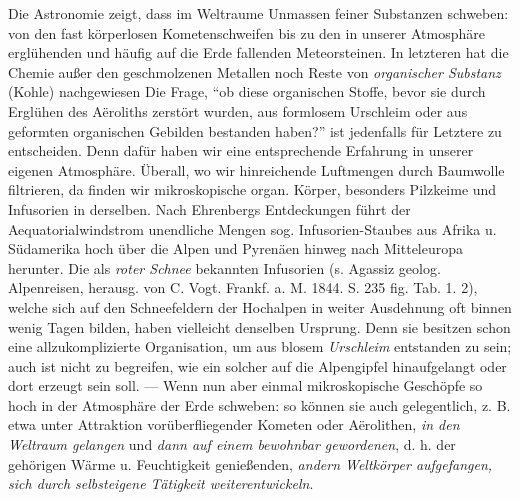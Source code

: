 \documentclass[a4paper, 11pt, oneside, english]{article}
\begin{document}
Die Astronomie zeigt, dass im Weltraume Unmassen feiner Substanzen schweben: von den fast körperlosen Kometenschweifen bis zu den in unserer Atmosphäre erglühenden und häufig auf die Erde fallenden Meteorsteinen. In letzteren hat die Chemie außer den geschmolzenen Metallen noch Reste von \emph{organischer Substanz} (Kohle) nachgewiesen Die Frage, "`ob diese organischen Stoffe, bevor sie durch Erglühen des Aëroliths zerstört wurden, aus formlosem Urschleim oder aus geformten organischen Gebilden bestanden haben?"' ist jedenfalls für Letztere zu entscheiden. Denn dafür haben wir eine entsprechende Erfahrung in unserer eigenen Atmosphäre. Überall, wo wir hinreichende Luftmengen durch Baumwolle filtrieren, da finden wir mikroskopische organ. Körper, besonders Pilzkeime und Infusorien in derselben. Nach Ehrenbergs Entdeckungen führt der Aequatorialwindstrom unendliche Mengen sog. Infusorien-Staubes aus Afrika u. Südamerika hoch über die Alpen und Pyrenäen hinweg nach Mitteleuropa herunter. Die als \emph{roter Schnee} bekannten Infusorien (s. Agassiz geolog. Alpenreisen, herausg. von C. Vogt. Frankf. a. M. 1844. S. 235 fig. Tab. 1. 2), welche sich auf den Schneefeldern der Hochalpen in weiter Ausdehnung oft binnen wenig Tagen bilden, haben vielleicht denselben Ursprung. Denn sie besitzen schon eine allzukomplizierte Organisation, um aus blosem \emph{Urschleim} entstanden zu sein; auch ist nicht zu begreifen, wie ein solcher auf die Alpengipfel hinaufgelangt oder dort erzeugt sein soll. --- Wenn nun aber einmal mikroskopische Geschöpfe so hoch in der Atmosphäre der Erde schweben: so können sie auch gelegentlich, z. B. etwa unter Attraktion vorüberfliegender Kometen oder Aërolithen, \emph{in den Weltraum gelangen} und \emph{dann auf einem bewohnbar gewordenen}, d. h. der gehörigen Wärme u. Feuchtigkeit genießenden, \emph{andern Weltkörper aufgefangen, sich durch selbsteigene Tätigkeit weiterentwickeln}.
\end{document}
